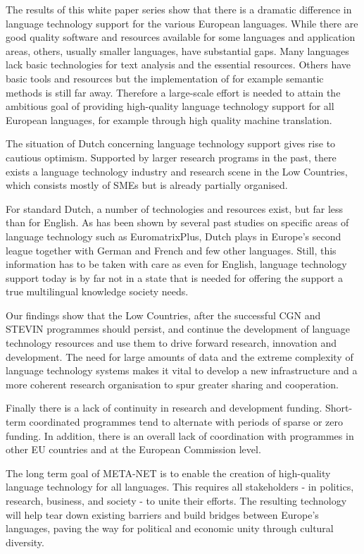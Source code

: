 \documentclass[]{../../metanetpaper}
\begin{document}
\begin{multicols}{2}
The results of this white paper series show that there is a dramatic difference in language technology support for the various European languages. While there are good quality software and resources available for some languages and application areas, others, usually smaller languages, have substantial gaps. Many languages lack basic technologies for text analysis and the essential resources. Others have basic tools and resources but the implementation of for example semantic methods is still far away. Therefore a large-scale effort is needed to attain the ambitious goal of providing high-quality language technology support for all European languages, for example through high quality machine translation. 

   The situation of Dutch concerning language technology support gives rise to cautious optimism. Supported by larger research programs in the past, there exists a language technology industry and research scene in the Low Countries, which consists mostly of SMEs but is already partially organised.

    For standard Dutch, a number of technologies and resources exist, but far less than for English. As has been shown by several past studies on specific areas of language technology such as EuromatrixPlus, Dutch plays in Europe's second league together with German and French and few other languages. Still, this information has to be taken with care as even for English, language technology support today is by far not in a state that is needed for offering the support a true multilingual knowledge society needs.

    Our findings show that the Low Countries, after the successful CGN and STEVIN programmes should persist, and continue the development of language technology resources and use them to drive forward research, innovation and development. The need for large amounts of data and the extreme complexity of language technology systems makes it vital to develop a new infrastructure and a more coherent research organisation to spur greater sharing and cooperation.


Finally there is a lack of continuity in research and development funding. Short-term coordinated programmes tend to alternate with periods of sparse or zero funding. In addition, there is an overall lack of coordination with programmes in other EU countries and at the European Commission level.

The long term goal of META-NET is to enable the creation of high-quality language technology for all languages. This requires all stakeholders - in politics, research, business, and society - to unite their efforts. The resulting technology will help tear down existing barriers and build bridges between Europe’s languages, paving the way for political and economic unity through cultural diversity. 
\end{multicols}
\end{document}
